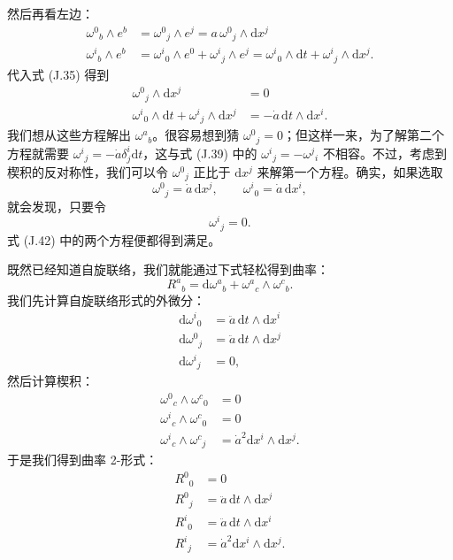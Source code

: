 然后再看左边：
\begin{align*}
\omega^{0}{}_{b}\wedge e^{b} &= \omega^{0}{}_{j}\wedge e^{j} = a\,\omega^{0}{}_{j}\wedge\mathrm{d}x^{j} \\
\omega^{i}{}_{b}\wedge e^{b} &= \omega^{i}{}_{0}\wedge e^{0} + \omega^{i}{}_{j}\wedge e^{j} = \omega^{i}{}_{0}\wedge\mathrm{d}t + \omega^{i}{}_{j}\wedge\mathrm{d}x^{j}. \tag{J.41}
\end{align*}
代入式 (J.35) 得到
\begin{align*}
\omega^{0}{}_{j}\wedge\mathrm{d}x^{j} &= 0 \\
\omega^{i}{}_{0}\wedge\mathrm{d}t + \omega^{i}{}_{j}\wedge\mathrm{d}x^{j} &= -\dot{a}\,\mathrm{d}t\wedge\mathrm{d}x^{i}. \tag{J.42}
\end{align*}
我们想从这些方程解出 $\omega^{a}{}_{b}$。很容易想到猜 $\omega^{0}{}_{j} = 0$；但这样一来，为了解第二个方程就需要 $\omega^{i}{}_{j} = -\dot{a}\delta^{i}_{j}\mathrm{d}t$，这与式 (J.39) 中的 $\omega^{i}{}_{j} = -\omega^{j}{}_{i}$ 不相容。不过，考虑到楔积的反对称性，我们可以令 $\omega^{0}{}_{j}$ 正比于 $\mathrm{d}x^{j}$ 来解第一个方程。确实，如果选取
\begin{equation*}
\omega^{0}{}_{j} = \dot{a}\,\mathrm{d}x^{j}, \qquad \omega^{i}{}_{0} = \dot{a}\,\mathrm{d}x^{i},
\tag{J.43}
\end{equation*}
就会发现，只要令
\begin{equation*}
\omega^{i}{}_{j} = 0.
\tag{J.44}
\end{equation*}
式 (J.42) 中的两个方程便都得到满足。

既然已经知道自旋联络，我们就能通过下式轻松得到曲率：
\begin{equation*}
R^{a}{}_{b} = \mathrm{d}\omega^{a}{}_{b} + \omega^{a}{}_{c}\wedge\omega^{c}{}_{b}.
\tag{J.45}
\end{equation*}
我们先计算自旋联络形式的外微分：
\begin{align*}
\mathrm{d}\omega^{i}{}_{0} &= \ddot{a}\,\mathrm{d}t\wedge\mathrm{d}x^{i} \\
\mathrm{d}\omega^{0}{}_{j} &= \ddot{a}\,\mathrm{d}t\wedge\mathrm{d}x^{j} \\
\mathrm{d}\omega^{i}{}_{j} &= 0, \tag{J.46}
\end{align*}
然后计算楔积：
\begin{align*}
\omega^{0}{}_{c}\wedge\omega^{c}{}_{0} &= 0 \\
\omega^{i}{}_{c}\wedge\omega^{c}{}_{0} &= 0 \\
\omega^{i}{}_{c}\wedge\omega^{c}{}_{j} &= \dot{a}^{2}\mathrm{d}x^{i}\wedge\mathrm{d}x^{j}. \tag{J.47}
\end{align*}
于是我们得到曲率 2-形式：
\begin{align*}
R^{0}{}_{0} &= 0 \\
R^{0}{}_{j} &= \ddot{a}\,\mathrm{d}t\wedge\mathrm{d}x^{j} \\
R^{i}{}_{0} &= \ddot{a}\,\mathrm{d}t\wedge\mathrm{d}x^{i} \\
R^{i}{}_{j} &= \dot{a}^{2}\mathrm{d}x^{i}\wedge\mathrm{d}x^{j}. \tag{J.48}
\end{align*}

